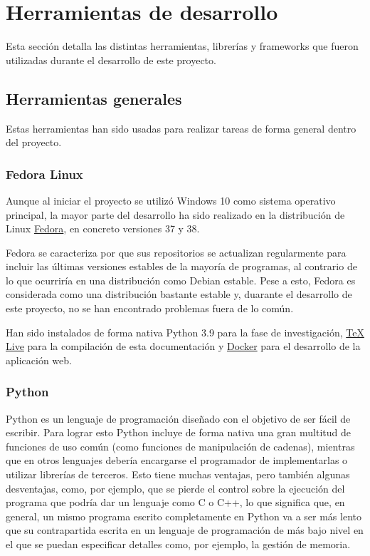 
\section{Herramientas de desarrollo}

Esta sección detalla las distintas herramientas, librerías y frameworks que
fueron utilizadas durante el desarrollo de este proyecto.

\subsection{Herramientas generales}

Estas herramientas han sido usadas para realizar tareas de forma general dentro
del proyecto.

\subsubsection{Fedora Linux}

Aunque al iniciar el proyecto se utilizó Windows 10 como sistema operativo
principal, la mayor parte del desarrollo ha sido realizado en la distribución de
Linux \href{https://fedoraproject.org/}{Fedora}, en concreto versiones 37 y 38.

Fedora se caracteriza por que sus repositorios se actualizan regularmente para
incluir las últimas versiones estables de la mayoría de programas, al contrario
de lo que ocurriría en una distribución como Debian estable. Pese a esto, Fedora
es considerada como una distribución bastante estable y, duarante el desarrollo
de este proyecto, no se han encontrado problemas fuera de lo común.

Han sido instalados de forma nativa Python 3.9 para la fase de investigación,
\href{https://www.tug.org/texlive/}{\TeX{} Live} para la compilación de esta
documentación y \href{https://www.docker.com/}{Docker} para el desarrollo de la
aplicación web.

\subsubsection{Python}

Python es un lenguaje de programación diseñado con el objetivo de ser fácil de
escribir. Para lograr esto Python incluye de forma nativa una gran multitud de
funciones de uso común (como funciones de manipulación de cadenas), mientras que
en otros lenguajes debería encargarse el programador de implementarlas o
utilizar librerías de terceros. Esto tiene muchas ventajas, pero también algunas
desventajas, como, por ejemplo, que se pierde el control sobre la ejecución del
programa que podría dar un lenguaje como C o C++, lo que significa que, en
general, un mismo programa escrito completamente en Python va a ser más lento
que su contrapartida escrita en un lenguaje de programación de más bajo nivel en
el que se puedan especificar detalles como, por ejemplo, la gestión de memoria.

